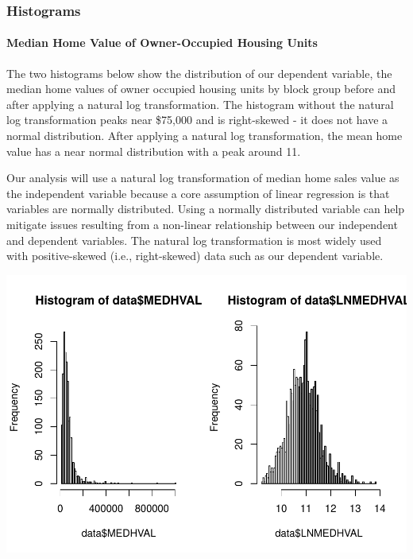 \documentclass[
]{article}
\begin{document}
\hypertarget{histograms}{%
\subsubsection{Histograms}\label{histograms}}

\hypertarget{median-home-value-of-owner-occupied-housing-units}{%
\paragraph{Median Home Value of Owner-Occupied Housing
Units}\label{median-home-value-of-owner-occupied-housing-units}}

The two histograms below show the distribution of our dependent
variable, the median home values of owner occupied housing units by
block group before and after applying a natural log transformation. The
histogram without the natural log transformation peaks near \$75,000 and
is right-skewed - it does not have a normal distribution. After applying
a natural log transformation, the mean home value has a near normal
distribution with a peak around 11.

Our analysis will use a natural log transformation of median home sales
value as the independent variable because a core assumption of linear
regression is that variables are normally distributed. Using a normally
distributed variable can help mitigate issues resulting from a
non-linear relationship between our independent and dependent variables.
The natural log transformation is most widely used with positive-skewed
(i.e., right-skewed) data such as our dependent variable.

\includegraphics{HW1-Regression_files/figure-latex/hist_MEDHVAL-1.pdf}
\end{document}
